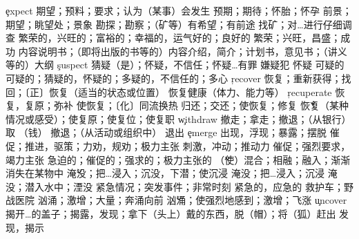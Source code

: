 \begin{multicols}{2}
\c{expect}  \vt 期望；预料；要求；认为（某事）会发生 \vi 预期；期待；怀胎；怀孕
  \n 前景；期望；眺望处；景象 \vi 勘探；勘察；（矿等）有希望；有前途 \vt 找矿；对…进行仔细调查
  \a 繁荣的，兴旺的；富裕的；幸福的，运气好的；良好的
  \n 繁荣；兴旺，昌盛；成功
  \n 内容说明书；（即将出版的书等的）内容介绍，简介；计划书，意见书；（讲义等的）大纲
\c{suspect}  \vt 猜疑（是）；怀疑，不信任；怀疑…有罪 \n 嫌疑犯 \vi 怀疑 \a 可疑的
  \a 可疑的；猜疑的，怀疑的；多疑的，不信任的；多心
\c{recover}  \vt 恢复；重新获得；找回；〔正〕恢复（适当的状态或位置） \vi 恢复健康（体力、能力等）
\c{recuperate}  \vi 恢复，复原；弥补 \vt 使恢复；〔化〕同流换热
  \vt 归还；交还；使恢复；修复 \v 恢复（某种情况或感受）；使复原；使复位；使复职
\c{withdraw}  \vt 撤走；拿走；撤退；（从银行） 取 （钱） \vi 撤退；（从活动或组织中） 退出
\c{emerge}  \vi 出现，浮现；暴露；摆脱
  \vt 催促；推进，驱策；力劝，规劝；极力主张 \n 刺激，冲动；推动力 \vi 催促；强烈要求，竭力主张
  \a 急迫的；催促的；强求的；极力主张的
  \v （使）混合；相融；融入；渐渐消失在某物中
  \v 淹没；把…浸入；沉没，下潜；使沉浸 \vt 淹没；把…浸入；沉浸 \vi 淹没；潜入水中；湮没
  \n 紧急情况；突发事件；非常时刻 \a 紧急的，应急的
  \n 救护车；野战医院
  \n 汹涌；激增；大量；奔涌向前 \v 汹涌；使强烈地感到；激增；飞涨
\c{uncover}  \vt 揭开…的盖子；揭露，发现；拿下（头上）戴的东西，脱（帽）；将（狐）赶出 \vi 发现，揭示


\end{multicols}
